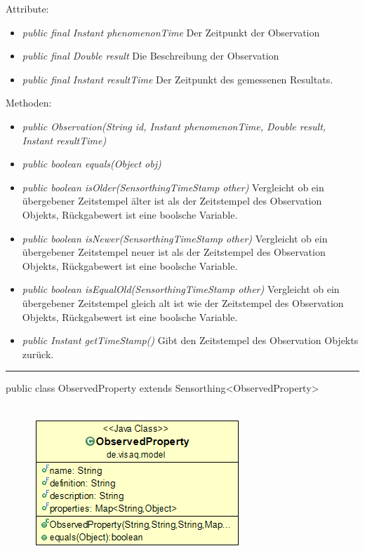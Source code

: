 Attribute:
\begin{itemize} 
	\item \emph{public final Instant phenomenonTime} Der Zeitpunkt der Observation
	\item \emph{public final Double result} Die Beschreibung der Observation
	\item \emph{public final Instant resultTime} Der Zeitpunkt des gemessenen Resultats.
\end{itemize}
Methoden:
\begin{itemize} 
	\item \emph{public Observation(String id, Instant phenomenonTime, Double result, Instant resultTime)} 
	\item \emph{public boolean equals(Object obj)} 
	\item \emph{public boolean isOlder(SensorthingTimeStamp other)} Vergleicht ob ein übergebener Zeitstempel älter ist als der Zeitstempel des Observation Objekts, Rückgabewert ist eine boolsche Variable.
	\item \emph{public boolean isNewer(SensorthingTimeStamp other)} Vergleicht ob ein übergebener Zeitstempel neuer ist als der Zeitstempel des Observation Objekts, Rückgabewert ist eine boolsche Variable.
	\item \emph{public boolean isEqualOld(SensorthingTimeStamp other)} Vergleicht ob ein übergebener Zeitstempel gleich alt ist wie der Zeitstempel des Observation Objekts, Rückgabewert ist eine boolsche Variable.
	\item \emph{public Instant getTimeStamp()} Gibt den Zeitstempel des Observation Objekts zurück.
\end{itemize}

\rule{\textwidth}{0.4pt}
public class ObservedProperty extends Sensorthing<ObservedProperty>
\\\\
\begin{minipage}{0.3\textwidth}
	\begin{figure}[H]
		\includegraphics[scale = 0.5
		]{media/frontend/model/ObservedPropertyClass.png}
	\end{figure}
\end{minipage} \hfill
\begin{minipage}{0.6\textwidth}
\end{minipage}

